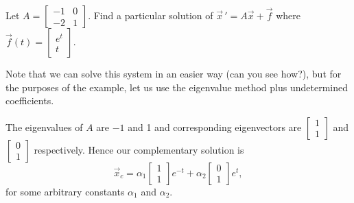 \documentclass[12pt]{book}
\begin{document}
\begin{example}
Let $A = \left[
\begin{smallmatrix}
-1 & 0 \\
-2 & 1
\end{smallmatrix} \right]$.
Find a particular solution of ${\vec{x}\,}' = A \vec{x} +
\vec{f}$ where $\vec{f}(t) = 
\left[ \begin{smallmatrix}
e^t \\
t
\end{smallmatrix} \right]$.

Note that we can solve this system in an easier way (can you see how?), but
for the purposes of the example, let us use the eigenvalue method plus
undetermined coefficients.

The eigenvalues of $A$ are 
$-1$ and 1 and corresponding eigenvectors
are
$\left[ \begin{smallmatrix}
1 \\
1
\end{smallmatrix} \right]$ and
$\left[ \begin{smallmatrix}
0 \\
1
\end{smallmatrix} \right]$ respectively.
Hence our complementary solution is
\begin{equation*}
\vec{x}_c = 
\alpha_1
\begin{bmatrix}
1 \\ 1
\end{bmatrix}
e^{-t}
+
\alpha_2
\begin{bmatrix}
0 \\ 1
\end{bmatrix}
e^{t} ,
\end{equation*}
for some arbitrary constants $\alpha_1$ and $\alpha_2$.


\end{example}
\end{document}
